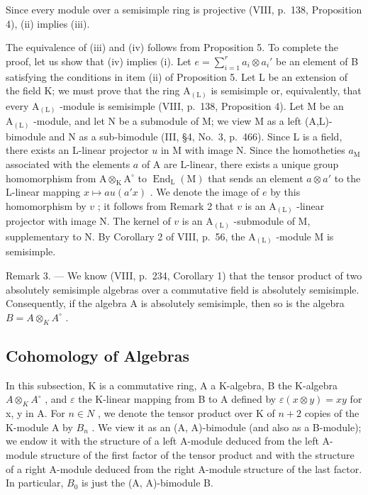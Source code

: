 Since every module over a semisimple ring is projective (VIII, p.~138, Proposition 4), (ii) implies (iii).

The equivalence of (iii) and (iv) follows from Proposition 5. To complete the proof, let us show that (iv) implies (i). Let \(e = \sum_{i=1}^{r} a_i \otimes a_i'\) be an element of B satisfying the conditions in item (ii) of Proposition 5. Let L be an extension of the field K; we must prove that the ring \(\mathrm{A}_{(\mathrm{L})}\) is semisimple or, equivalently, that every \(\mathrm{A}_{(\mathrm{L})}\) -module is semisimple (VIII, p.~138, Proposition 4). Let M be an \(\mathrm{A}_{(\mathrm{L})}\) -module, and let N be a submodule of M; we view M as a left (A,L)-bimodule and N as a sub-bimodule (III, §4, No.~3, p.~466). Since L is a field, there exists an L-linear projector \(u\) in M with image N. Since the homotheties \(a_{\mathrm{M}}\) associated with the elements \(a\) of A are L-linear, there exists a unique group homomorphism from \(\mathrm{A} \otimes_{\mathrm{K}} \mathrm{A}^{\circ}\) to \(\operatorname{End}_{\mathrm{L}}(\mathrm{M})\) that sends an element \(a \otimes a'\) to the L-linear mapping \(x \mapsto au(a'x)\) . We denote the image of \(e\) by this homomorphism by \(v\) ; it follows from Remark 2 that \(v\) is an \(\mathrm{A}_{(\mathrm{L})}\) -linear projector with image N. The kernel of \(v\) is an \(\mathrm{A}_{(\mathrm{L})}\) -submodule of M, supplementary to N. By Corollary 2 of VIII, p.~56, the \(\mathrm{A}_{(\mathrm{L})}\) -module M is semisimple.

Remark 3. --- We know (VIII, p.~234, Corollary 1) that the tensor product of two absolutely semisimple algebras over a commutative field is absolutely semisimple. Consequently, if the algebra A is absolutely semisimple, then so is the algebra \(B = A \otimes_{K} A^{\circ}\) .

\subsection{Cohomology of Algebras}

In this subsection, K is a commutative ring, A a K-algebra, B the K-algebra \(A \otimes_{K} A^{\circ}\) , and \(\varepsilon\) the K-linear mapping from B to A defined by \(\varepsilon(x \otimes y) = xy\) for x, y in A. For \(n \in N\) , we denote the tensor product over K of \(n + 2\) copies of the K-module A by \(B_{n}\) . We view it as an (A, A)-bimodule (and also as a B-module); we endow it with the structure of a left A-module deduced from the left A-module structure of the first factor of the tensor product and with the structure of a right A-module deduced from the right A-module structure of the last factor. In particular, \(B_{0}\) is just the (A, A)-bimodule B.

